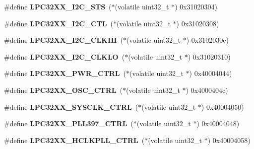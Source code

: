 \begin{DoxyCompactItemize}
\#define {\bfseries L\+P\+C32\+X\+X\+\_\+\+I2\+C\+\_\+\+S\+TS}~($\ast$(volatile uint32\+\_\+t $\ast$) 0x31020304)
\item 
\mbox{\label{group__lpc32xx__reg_gade67f630cc75ae081851ceeb29905ba2}} 
\#define {\bfseries L\+P\+C32\+X\+X\+\_\+\+I2\+C\+\_\+\+C\+TL}~($\ast$(volatile uint32\+\_\+t $\ast$) 0x31020308)
\item 
\mbox{\label{group__lpc32xx__reg_ga80ae1ebbd53bfc63e0230cae85c11be5}} 
\#define {\bfseries L\+P\+C32\+X\+X\+\_\+\+I2\+C\+\_\+\+C\+L\+K\+HI}~($\ast$(volatile uint32\+\_\+t $\ast$) 0x3102030c)
\item 
\mbox{\label{group__lpc32xx__reg_gae77307eb85f6997ad1e891372a702267}} 
\#define {\bfseries L\+P\+C32\+X\+X\+\_\+\+I2\+C\+\_\+\+C\+L\+K\+LO}~($\ast$(volatile uint32\+\_\+t $\ast$) 0x31020310)
\item 
\mbox{\label{group__lpc32xx__reg_ga8a3c22fede939936499b25e01482273d}} 
\#define {\bfseries L\+P\+C32\+X\+X\+\_\+\+P\+W\+R\+\_\+\+C\+T\+RL}~($\ast$(volatile uint32\+\_\+t $\ast$) 0x40004044)
\item 
\mbox{\label{group__lpc32xx__reg_gac40ed60f058173bfbc8e36879b899cc0}} 
\#define {\bfseries L\+P\+C32\+X\+X\+\_\+\+O\+S\+C\+\_\+\+C\+T\+RL}~($\ast$(volatile uint32\+\_\+t $\ast$) 0x4000404c)
\item 
\mbox{\label{group__lpc32xx__reg_gada465b36a8b8ce63cd2ee270c4454391}} 
\#define {\bfseries L\+P\+C32\+X\+X\+\_\+\+S\+Y\+S\+C\+L\+K\+\_\+\+C\+T\+RL}~($\ast$(volatile uint32\+\_\+t $\ast$) 0x40004050)
\item 
\mbox{\label{group__lpc32xx__reg_ga2f84f67d08b8d0018010a32babff48f6}} 
\#define {\bfseries L\+P\+C32\+X\+X\+\_\+\+P\+L\+L397\+\_\+\+C\+T\+RL}~($\ast$(volatile uint32\+\_\+t $\ast$) 0x40004048)
\item 
\mbox{\label{group__lpc32xx__reg_gaa1d6e516f0dd3d21c0cf0f1b6a68f1f3}} 
\#define {\bfseries L\+P\+C32\+X\+X\+\_\+\+H\+C\+L\+K\+P\+L\+L\+\_\+\+C\+T\+RL}~($\ast$(volatile uint32\+\_\+t $\ast$) 0x40004058)
\item 

\end{DoxyCompactItemize}
